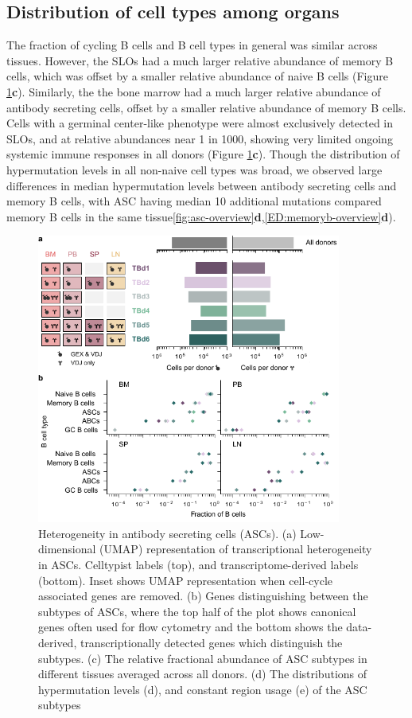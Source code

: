 \subsection{Distribution of cell types among organs}
The fraction of cycling B cells and B cell types in general was similar across tissues. However, the SLOs had a much larger relative abundance of memory B cells, which was offset by a smaller relative abundance of naive B cells (Figure \ref{fig:study-overview}\textbf{c}). Similarly, the the bone marrow had a much larger relative abundance of antibody secreting cells, offset by a smaller relative abundance of memory B cells. Cells with a germinal center-like phenotype were almost exclusively detected in SLOs, and at relative abundances near 1 in 1000, showing very limited ongoing systemic immune responses in all donors  (Figure \ref{fig:study-overview}\textbf{c}). Though the distribution of hypermutation levels in all  non-naive cell types was broad, we observed large differences in median hypermutation levels between antibody secreting cells and memory B cells, with ASC having median 10 additional mutations compared memory B cells in the same tissue\ref{fig:asc-overview}\textbf{d},\ref{ED:memoryb-overview}\textbf{d}).   
\begin{figure}
    \centering
    \includegraphics[width=10cm]{figs/Tabula_Bursa/Figure1_ab_antibody_version.pdf}

    \caption[\textit{In vivo} study overview]{Heterogeneity in antibody secreting cells (ASCs). (a) Low-dimensional (UMAP) representation of transcriptional heterogeneity in ASCs. Celltypist labels (top), and transcriptome-derived labels (bottom). Inset shows UMAP representation when cell-cycle associated genes are removed. (b) Genes distinguishing between the subtypes of ASCs, where the top half of the plot shows canonical genes often used for flow cytometry and the bottom shows the data-derived, transcriptionally detected genes which distinguish the subtypes. (c) The relative fractional abundance of ASC subtypes in different tissues averaged across all donors. (d) The distributions of  hypermutation levels (d),  and constant region usage (e) of the ASC subtypes}
    \label{fig:study-overview}
\end{figure}


